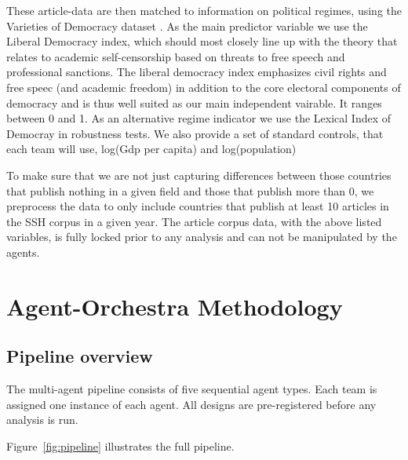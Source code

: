 \documentclass[12pt,a4paper]{article}
\begin{document}
These article-data are then matched to information on political regimes, using the Varieties of Democracy dataset \citep{Coppedge2024}. As the main predictor variable we use the Liberal Democracy index, which should most closely line up with the theory that relates to academic self-censorship based on threats to free speech and professional sanctions. The liberal democracy index emphasizes civil rights and free speec (and academic freedom) in addition to the core electoral components of democracy and is thus well suited as our main independent vairable. It ranges between 0 and 1. As an alternative regime indicator we use the Lexical Index of Democray \citep{skaaning2015lexical} in robustness tests. We also provide a set of standard controls, that each team will use, log(Gdp per capita) and log(population)

To make sure that we are not just capturing differences between those countries that publish nothing in a given field and those that publish more than 0, we preprocess the data to only include countries that publish at least 10 articles in the SSH corpus in a given year. The article corpus data, with the above listed variables, is fully locked prior to any analysis and can not be manipulated by the agents.
 
\section{Agent-Orchestra Methodology}
\label{sec:method}

\subsection{Pipeline overview}
The multi-agent pipeline consists of five sequential agent
types. Each team is assigned one instance of each agent. All designs
are pre-registered before any analysis is run.

Figure~\ref{fig:pipeline} illustrates the full pipeline.

\end{document}
